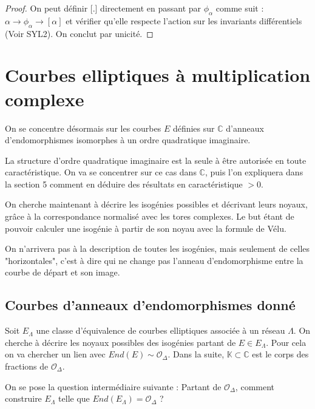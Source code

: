 \documentclass{article}
\newcommand{\C}[0]{\mathbb{C}}
\newcommand{\K}[0]{\mathbb{K}}
\newcommand{\OR}[0]{\mathcal{O}}
\begin{document}
\begin{proof}
	On peut définir [.] directement en passant par $\phi_{\alpha}$ comme suit : $\alpha\rightarrow\phi_{\alpha}\rightarrow [\alpha]$ et vérifier qu'elle respecte l'action sur les invariants différentiels (Voir SYL2). On conclut par unicité. 
\end{proof}








\section{Courbes elliptiques à multiplication complexe}

On se concentre désormais sur les courbes $E$ définies sur $\C$ d'anneaux d'endomorphismes isomorphes à un ordre quadratique imaginaire. 

La structure d'ordre quadratique imaginaire est la seule à être autorisée en toute caractéristique. On va se concentrer sur ce cas dans $\C$, puis l'on expliquera dans la section 5 comment en déduire des résultats en caractéristique $>0$.

On cherche maintenant à décrire les isogénies possibles et décrivant leurs noyaux, grâce à la correspondance normalisé avec les tores complexes. Le but étant de pouvoir calculer une isogénie à partir de son noyau avec la formule de Vélu. 

On n'arrivera pas à la description de toutes les isogénies, mais seulement de celles "horizontales", c'est à dire qui ne change pas l’anneau d'endomorphisme entre la courbe de départ et son image. 








\subsection{Courbes d'anneaux d'endomorphismes donné}

Soit $E_{\Lambda}$ une classe d'équivalence de courbes elliptiques associée à un réseau $\Lambda$. On cherche à décrire les noyaux possibles des isogénies partant de $E\in E_{\Lambda}$. Pour cela on va chercher un lien avec $End(E)\sim\OR_{\Delta}$. Dans la suite, $\K\subset\C$ est le corps des fractions de $\OR_{\Delta}$. 

On se pose la question intermédiaire suivante : Partant de $\OR_{\Delta}$, comment construire $E_{\Lambda}$ telle que $End(E_{\Lambda}) = \OR_{\Delta}$ ? 
\end{document}
